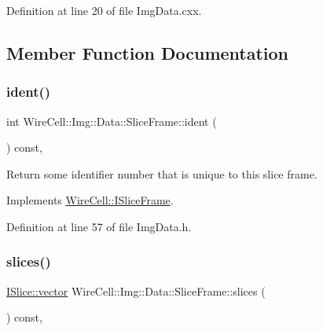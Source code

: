 Definition at line 20 of file Img\+Data.\+cxx.



\subsection{Member Function Documentation}
\mbox{\label{class_wire_cell_1_1_img_1_1_data_1_1_slice_frame_a958796aa5c7faa7b6a2195d30a4b5f2a}} 
\subsubsection{\texorpdfstring{ident()}{ident()}}
{\footnotesize\ttfamily int Wire\+Cell\+::\+Img\+::\+Data\+::\+Slice\+Frame\+::ident (\begin{DoxyParamCaption}{ }\end{DoxyParamCaption}) const\hspace{0.3cm}{\ttfamily [inline]}, {\ttfamily [virtual]}}



Return some identifier number that is unique to this slice frame. 



Implements \hyperlink{class_wire_cell_1_1_i_slice_frame_a225275e1508b1002f71727f07d802dba}{Wire\+Cell\+::\+I\+Slice\+Frame}.



Definition at line 57 of file Img\+Data.\+h.

\mbox{\label{class_wire_cell_1_1_img_1_1_data_1_1_slice_frame_a5fc36949d12f7fb66ef1b6decdf774b5}} 
\subsubsection{\texorpdfstring{slices()}{slices()}}
{\footnotesize\ttfamily \hyperlink{class_wire_cell_1_1_i_data_ae1a9f863380499bb43f39fabb6276660}{I\+Slice\+::vector} Wire\+Cell\+::\+Img\+::\+Data\+::\+Slice\+Frame\+::slices (\begin{DoxyParamCaption}{ }\end{DoxyParamCaption}) const\hspace{0.3cm}{\ttfamily [inline]}, {\ttfamily [virtual]}}



